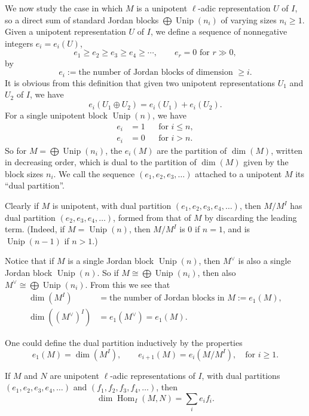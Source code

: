We now study the case in which \(M\) is a unipotent \(\ell\)-adic
representation \(U\) of \(I\), so a direct sum of standard Jordan blocks
\(\bigoplus\operatorname{Unip}(n_i)\) of varying sizes \(n_i\geq 1\). Given a
unipotent representation \(U\) of \(I\), we define a sequence of nonnegative
integers \(e_i=e_i(U)\),
\[
  e_1\geq e_2\geq e_3\geq e_4\geq\cdots,\qquad e_r=0\text{ for }r\gg 0,
\]
by
\[
  e_i:=\text{the number of Jordan blocks of dimension }\geq i.
\]
It is obvious from this definition that given two unipotent representations
\(U_1\) and \(U_2\) of \(I\), we have
\[
  e_i(U_1\oplus U_2)=e_i(U_1)+e_i(U_2).
\]
For a single unipotent block \(\operatorname{Unip}(n)\), we have
\[
\begin{aligned}
  e_i&=1 &&\text{for }i\leq n,\\
  e_i&=0 &&\text{for }i>n.
\end{aligned}
\]
So for \(M=\bigoplus\operatorname{Unip}(n_i)\), the \(e_i(M)\) are the
partition of \(\dim(M)\), written in decreasing order, which is dual to the
partition of \(\dim(M)\) given by the block sizes \(n_i\). We call the sequence
\((e_1,e_2,e_3,\ldots)\) attached to a unipotent \(M\) its ``dual partition''.

Clearly if \(M\) is unipotent, with dual partition
\((e_1,e_2,e_3,e_4,\ldots)\), then \(M/M^I\) has dual partition
\((e_2,e_3,e_4,\ldots)\), formed from that of \(M\) by discarding the leading
term. (Indeed, if \(M=\operatorname{Unip}(n)\), then \(M/M^I\) is \(0\) if
\(n=1\), and is \(\operatorname{Unip}(n-1)\) if \(n>1\).)

Notice that if \(M\) is a single Jordan block \(\operatorname{Unip}(n)\), then
\(M^{\vee}\) is also a single Jordan block \(\operatorname{Unip}(n)\). So if
\(M\cong\bigoplus\operatorname{Unip}(n_i)\), then also
\(M^{\vee}\cong\bigoplus\operatorname{Unip}(n_i)\). From this we see that
\[
\begin{aligned}
  \dim(M^I)&=\text{the number of Jordan blocks in }M:=e_1(M),\\
  \dim((M^{\vee})^I)&=e_1(M^{\vee})=e_1(M).
\end{aligned}
\]

One could define the dual partition inductively by the properties
\[
  e_1(M)=\dim(M^I),\qquad e_{i+1}(M)=e_i(M/M^I),\quad\text{for }i\geq 1.
\]

If \(M\) and \(N\) are unipotent \(\ell\)-adic representations of \(I\), with
dual partitions \((e_1,e_2,e_3,e_4,\ldots)\) and
\((f_1,f_2,f_3,f_4,\ldots)\), then
\[
  \dim\operatorname{Hom}_I(M,N)=\sum_i e_i f_i.
\]

